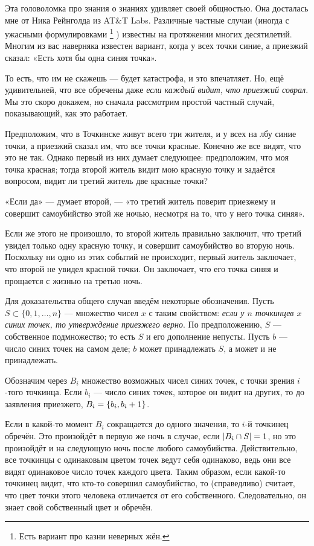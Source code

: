 Эта головоломка про знания о знаниях удивляет своей общностью.
Она досталась мне от Ника Рейнголда из AT\&T Labs.
Различные частные случаи (иногда с ужасными формулировками%
\footnote{Есть вариант про казни неверных жён.\pr}%
) известны на протяжении многих десятилетий.
Многим из вас наверняка известен вариант, когда у всех точки синие, а приезжий сказал: «Есть хотя бы одна синяя точка».

То есть, что им не скажешь --- будет катастрофа, и это впечатляет.
Но, ещё удивительней, что все обречены даже \emph{если каждый видит, что приезжий соврал}. 
Мы это скоро докажем, но сначала рассмотрим простой частный случай, показывающий, как это работает.

Предположим, что в Точкинске живут всего три жителя, и у всех на лбу синие точки, а приезжий сказал им, что все точки красные.
Конечно же все видят, что это не так.
Однако первый из них думает следующее: предположим, что моя точка красная; тогда второй житель видит мою красную точку и задаётся вопросом, видит ли третий житель две красные точки?

«Если да» --- думает второй, --- «то третий житель поверит приезжему и совершит самоубийство этой же ночью, несмотря на то, что у него точка синяя».

Если же этого не произошло, то второй житель правильно заключит, что третий увидел только одну красную точку, и совершит самоубийство во вторую ночь.
Поскольку ни одно из этих событий не происходит, первый житель заключает, что второй не увидел красной точки.
Он заключает, что его точка синяя и прощается с жизнью на третью ночь.

Для доказательства общего случая введём некоторые обозначения.
Пусть $S\subset\{0,1,\dots,n\}$ --- множество чисел $x$ с таким свойством: \emph{если у $n$ точкинцев $x$ синих точек, то утверждение приезжего верно}.
По предположению, $S$ --- собственное подмножество; то есть $S$ и его дополнение непусты.
Пусть $b$ --- число синих точек на самом деле;
$b$ может принадлежать $S$, а может и не принадлежать.

Обозначим через $B_i$ множество возможных чисел синих точек, с точки зрения $i$-того точкинца.
Если $b_i$ --- число синих точек, которое он видит на других, то до заявления приезжего, $B_i=\{b_i,b_i\z+1\}$.

Если в какой-то момент $B_i$ сокращается до одного значения, то $i$-й точкинец обречён.
Это произойдёт в первую же ночь в случае, если  $|B_i\z\cap S|=1$, но это произойдёт и на следующую ночь после любого самоубийства.
Действительно, все точкинцы с одинаковым цветом точек ведут себя одинаково, ведь они все видят одинаковое число точек каждого цвета.
Таким образом, если какой-то точкинец видит, что кто-то совершил самоубийство, то (справедливо) считает, что цвет точки этого человека отличается от его собственного. 
Следовательно, он знает свой собственный цвет и обречён.

